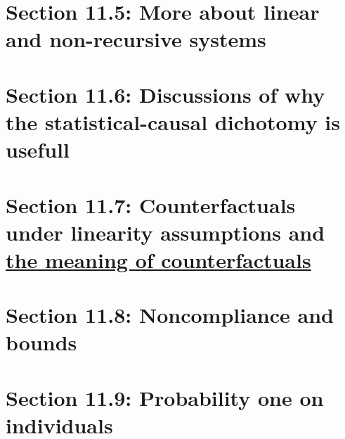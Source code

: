 \documentclass[oneside]{book}
\begin{document}
\section{Section 11.5: More about linear and non-recursive systems} 



\section{Section 11.6: Discussions of why the statistical-causal dichotomy is usefull}



\section{Section 11.7: Counterfactuals under linearity assumptions and \underline{the meaning of counterfactuals}}



\section{Section 11.8: Noncompliance and bounds}



\section{Section 11.9: Probability one on individuals}


\end{document}
